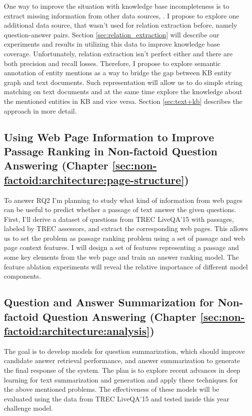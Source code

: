 One way to improve the situation with knowledge base incompleteness is to extract missing information from other data sources, \eg \cite{Cafarella:2008:WEP:1453856.1453916,Cafarella:2009:WES:1519103.1519112,Dong:2014:KVW:2623330.2623623,Etzioni:2008:OIE:1409360.1409378,Gupta:2014:BOS:2732286.2732288,kushmerick1997wrapper}.
I propose to explore one additional data source, that wasn't used for relation extraction before, namely question-answer pairs.
Section \ref{sec:relation_extraction} will describe our experiments and results in utilizing this data to improve knowledge base coverage.
Unfortunately, relation extraction isn't perfect either and there are both precision and recall losses.
Therefore, I propose to explore semantic annotation of entity mentions as a way to bridge the gap between KB entity graph and text documents.
Such representation will allow us to do simple string matching on text documents and at the same time explore the knowledge about the mentioned entities in KB and vice versa. Section \ref{sec:text+kb} describes the approach in more detail.

\subsection{Using Web Page Information to Improve Passage Ranking in Non-factoid Question Answering (Chapter \ref{sec:non-factoid:architecture:page-structure})}
\label{sec:plan2}

To answer RQ2 I'm planning to study what kind of information from web pages can be useful to predict whether a passage of text answer the given questions.
First, I'll derive a dataset of questions from TREC LiveQA'15 with passages, labeled by TREC assessors, and extract the corresponding web pages.
This allows us to set the problem as passage ranking problem using a set of passage and web page context features.
I will design a set of features representing a passage and some key elements from the web page and train an answer ranking model.
The feature ablation experiments will reveal the relative importance of different model components.

\subsection{Question and Answer Summarization for Non-factoid Question Answering (Chapter \ref{sec:non-factoid:architecture:analysis})}
\label{sec:plan3}

The goal is to develop models for question summarization, which should improve candidate answer retrieval performance, and answer summarization to generate the final response of the system.
The plan is to explore recent advances in deep learning for text summarization \cite{rush-chopra-weston:2015:EMNLP} and generation \cite{karpathy2015deep} and apply these techniques for the above mentioned problems.
The effectiveness of these models will be evaluated using the data from TREC LiveQA'15 and tested inside this year challenge model.


